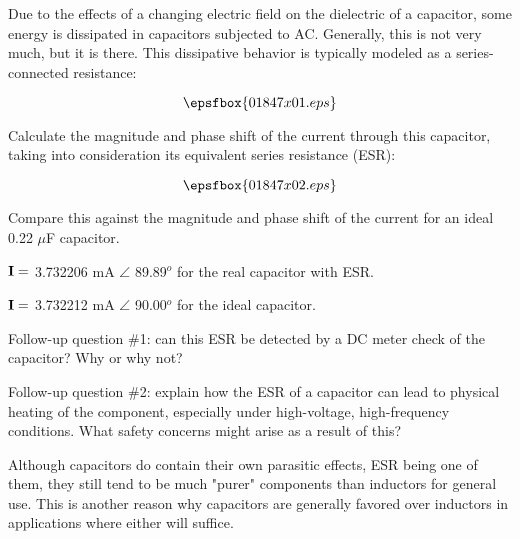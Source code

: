 

Due to the effects of a changing electric field on the dielectric of a capacitor, some energy is dissipated in capacitors subjected to AC.  Generally, this is not very much, but it is there.  This dissipative behavior is typically modeled as a series-connected resistance:

$$\epsfbox{01847x01.eps}$$

Calculate the magnitude and phase shift of the current through this capacitor, taking into consideration its equivalent series resistance (ESR):

$$\epsfbox{01847x02.eps}$$

Compare this against the magnitude and phase shift of the current for an ideal 0.22 $\mu$F capacitor.







${\bf I} =$ 3.732206 mA $\angle$ 89.89$^{o}$ for the real capacitor with ESR.

\vskip 10pt

${\bf I} =$ 3.732212 mA $\angle$ 90.00$^{o}$ for the ideal capacitor.

\vskip 10pt

Follow-up question \#1: can this ESR be detected by a DC meter check of the capacitor?  Why or why not?

\vskip 10pt

Follow-up question \#2: explain how the ESR of a capacitor can lead to physical heating of the component, especially under high-voltage, high-frequency conditions.  What safety concerns might arise as a result of this?







Although capacitors do contain their own parasitic effects, ESR being one of them, they still tend to be much "purer" components than inductors for general use.  This is another reason why capacitors are generally favored over inductors in applications where either will suffice.




